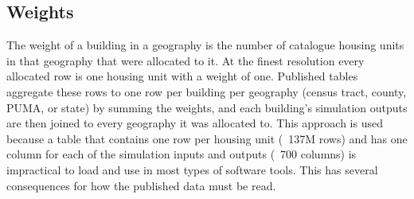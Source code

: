\subsection{Weights}\label{sec:sample_weights}
The weight of a building in a geography is the number of catalogue housing units in that geography that were allocated to it. At the finest resolution every allocated row is one housing unit with a weight of one. Published tables aggregate these rows to one row per building per geography (census tract, county, PUMA, or state) by summing the weights, and each building's simulation outputs are then joined to every geography it was allocated to. This approach is used because a table that contains one row per housing unit (~137M rows) and has one column for each of the simulation inputs and outputs (~700 columns) is impractical to load and use in most types of software tools. This has several consequences for how the published data must be read.

